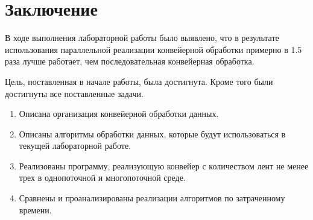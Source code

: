 \chapter*{Заключение}

В ходе выполнения лабораторной работы было выявлено, что в результате использования параллельной реализации конвейерной обработки примерно в 1.5 раза лучше работает, чем последовательная конвейерная обработка.

Цель, поставленная в начале работы, была достигнута. 
Кроме того были достигнуты все поставленные задачи.
\begin{enumerate}
	\item Описана организация конвейерной обработки данных.
	\item Описаны алгоритмы обработки данных, которые будут использоваться в текущей лабораторной работе.
	\item Реализованы программу, реализующую конвейер с количеством лент не менее трех в однопоточной и многопоточной среде.
	\item Сравнены и проанализированы реализации алгоритмов по затраченному времени.
\end{enumerate}
